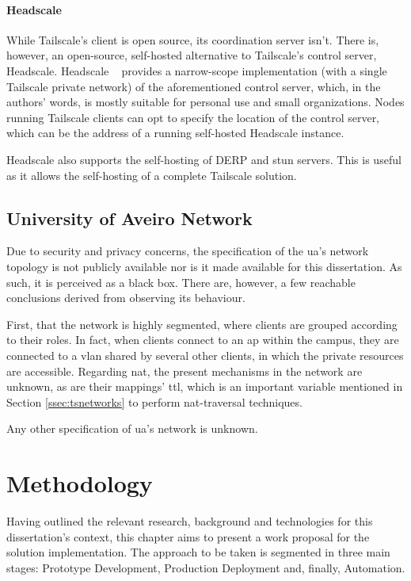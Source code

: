\documentclass[11pt,twoside,a4paper]{report}
\begin{document}
\subsubsection{Headscale}
\label{sec:hs}

While Tailscale's client is open source, its coordination server isn't. There is, however, an open-source, self-hosted alternative to Tailscale's control server, Headscale. Headscale ~\cite{headscale2023online} provides a narrow-scope implementation (with a single Tailscale private network) of the aforementioned control server, which, in the authors' words, is mostly suitable for personal use and small organizations. Nodes running Tailscale clients can opt to specify the location of the control server, which can be the address of a running self-hosted Headscale instance.

Headscale also supports the self-hosting of \ac{DERP} and \ac{stun} servers. This is useful as it allows the self-hosting of a complete Tailscale solution.

\section{University of Aveiro Network}
\label{sec:uanet}

Due to security and privacy concerns, the specification of the \ac{ua}'s network topology is not publicly available nor is it made available for this dissertation. As such, it is perceived as a black box. There are, however, a few reachable conclusions derived from observing its behaviour.

First, that the network is highly segmented, where clients are grouped according to their roles. In fact, when clients connect to an \ac{ap} within the campus, they are connected to a \ac{vlan} shared by several other clients, in which the private resources are accessible. Regarding \ac{nat}, the present mechanisms in the network are unknown, as are their mappings' \ac{ttl}, which is an important variable mentioned in Section \ref{ssec:tsnetworks} to perform \ac{nat}-traversal techniques.

Any other specification of \ac{ua}'s network is unknown.

\chapter{Methodology}
\label{chapter:method}

Having outlined the relevant research, background and technologies for this dissertation's context, this chapter aims to present a work proposal for the solution implementation. The approach to be taken is segmented in three main stages: Prototype Development, Production Deployment and, finally, Automation.
\end{document}
